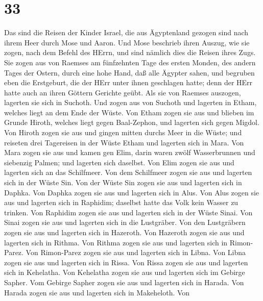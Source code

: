 \hypertarget{section-32}{%
\section{33}\label{section-32}}

 Das sind die Reisen der Kinder Israel, die aus Ägyptenland
gezogen sind nach ihrem Heer durch Mose und Aaron.  Und Mose
beschrieb ihren Auszug, wie sie zogen, nach dem Befehl des HErrn, und
sind nämlich dies die Reisen ihres Zugs.  Sie zogen aus von
Raemses am fünfzehnten Tage des ersten Monden, des andern Tages der
Ostern, durch eine hohe Hand, daß alle Ägypter sahen,  und
begruben eben die Erstgeburt, die der HErr unter ihnen geschlagen hatte;
denn der HErr hatte auch an ihren Göttern Gerichte geübt. 
Als sie von Raemses auszogen, lagerten sie sich in Suchoth. 
Und zogen aus von Suchoth und lagerten in Etham, welches liegt an dem
Ende der Wüste.  Von Etham zogen sie aus und blieben im
Grunde Hiroth, welches liegt gegen Baal-Zephon, und lagerten sich gegen
Migdol.  Von Hiroth zogen sie aus und gingen mitten durchs
Meer in die Wüste; und reiseten drei Tagereisen in der Wüste Etham und
lagerten sich in Mara.  Von Mara zogen sie aus und kamen gen
Elim, darin waren zwölf Wasserbrunnen und siebenzig Palmen; und lagerten
sich daselbst.  Von Elim zogen sie aus und lagerten sich an
das Schilfmeer.  Von dem Schilfmeer zogen sie aus und
lagerten sich in der Wüste Sin.  Von der Wüste Sin zogen
sie aus und lagerten sich in Daphka.  Von Daphka zogen sie
aus und lagerten sich in Alus.  Von Alus zogen sie aus und
lagerten sich in Raphidim; daselbst hatte das Volk kein Wasser zu
trinken.  Von Raphidim zogen sie aus und lagerten sich in
der Wüste Sinai.  Von Sinai zogen sie aus und lagerten sich
in die Lustgräber.  Von den Lustgräbern zogen sie aus und
lagerten sich in Hazeroth.  Von Hazeroth zogen sie aus und
lagerten sich in Rithma.  Von Rithma zogen sie aus und
lagerten sich in Rimon-Parez.  Von Rimon-Parez zogen sie
aus und lagerten sich in Libna.  Von Libna zogen sie aus
und lagerten sich in Rissa.  Von Rissa zogen sie aus und
lagerten sich in Kehelatha.  Von Kehelatha zogen sie aus
und lagerten sich im Gebirge Sapher.  Vom Gebirge Sapher
zogen sie aus und lagerten sich in Harada.  Von Harada
zogen sie aus und lagerten sich in Makeheloth.  Von
